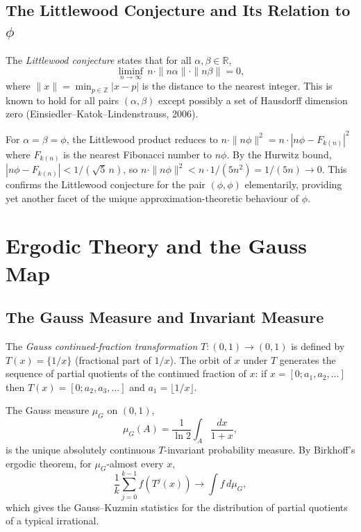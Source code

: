 \subsection{The Littlewood Conjecture and Its Relation to $\phi$}
\label{subsec:littlewood}

The \emph{Littlewood conjecture} states that for
all $\alpha, \beta \in \mathbb{R}$,
\[
  \liminf_{n \to \infty}\,
  n \cdot \|n\alpha\| \cdot \|n\beta\| = 0,
\]
where $\|x\| = \min_{p \in \mathbb{Z}} |x - p|$
is the distance to the nearest integer.  This is
known to hold for all pairs $(\alpha, \beta)$
except possibly a set of Hausdorff dimension zero
(Einsiedler--Katok--Lindenstrauss, 2006).

For $\alpha = \beta = \phi$, the Littlewood
product reduces to
$n \cdot \|n\phi\|^2 = n \cdot |n\phi - F_{k(n)}|^2$
where $F_{k(n)}$ is the nearest Fibonacci number
to $n\phi$.  By the Hurwitz bound,
$|n\phi - F_{k(n)}| < 1/(\sqrt{5}\,n)$, so
$n \cdot \|n\phi\|^2 < n \cdot 1/(5n^2) = 1/(5n) \to 0$.
This confirms the Littlewood conjecture for the
pair $(\phi, \phi)$ elementarily, providing yet
another facet of the unique approximation-theoretic
behaviour of $\phi$.

\section{Ergodic Theory and the Gauss Map}
\label{sec:ergodic-theory}

\subsection{The Gauss Measure and Invariant Measure}
\label{subsec:gauss-measure}

The \emph{Gauss continued-fraction transformation}
$T: (0,1) \to (0,1)$ is defined by
$T(x) = \{1/x\}$ (fractional part of $1/x$).
The orbit of $x$ under $T$ generates the sequence
of partial quotients of the continued fraction of
$x$: if $x = [0; a_1, a_2, \ldots]$ then
$T(x) = [0; a_2, a_3, \ldots]$ and $a_1 = \lfloor 1/x \rfloor$.

The Gauss measure $\mu_G$ on $(0,1)$,
\[
  \mu_G(A) = \frac{1}{\ln 2} \int_A \frac{dx}{1+x},
\]
is the unique absolutely continuous $T$-invariant
probability measure.  By Birkhoff's ergodic
theorem, for $\mu_G$-almost every $x$,
\[
  \frac{1}{k}\sum_{j=0}^{k-1} f(T^j(x))
  \to \int f \,d\mu_G,
\]
which gives the Gauss--Kuzmin statistics for the
distribution of partial quotients of a typical
irrational.


